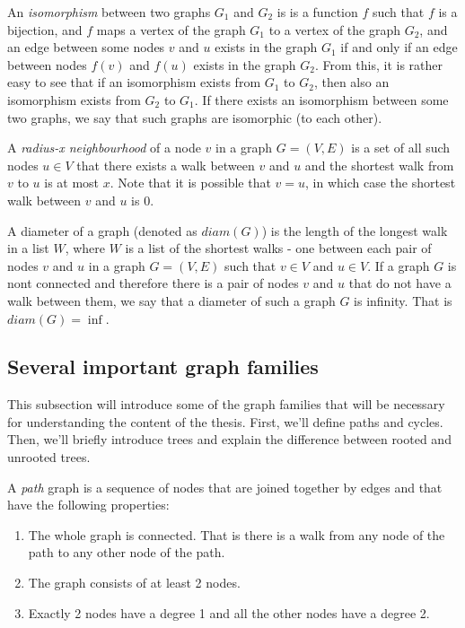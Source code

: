 An \emph{isomorphism} between two graphs $G_1$ and $G_2$ is is a function $f$ such that $f$ is a 
bijection, and $f$ maps a vertex of the graph $G_1$ to a vertex of the graph $G_2$, and 
an edge between some nodes $v$ and $u$ exists in the graph $G_1$ if and only if
an edge between nodes $f(v)$ and $f(u)$ exists in the graph $G_2$. From this,
it is rather easy to see that if an isomorphism exists from $G_1$ to $G_2$, then
also an isomorphism exists from $G_2$ to $G_1$. If there exists an
isomorphism between some two graphs, we say that such graphs are isomorphic
(to each other).

A \emph{radius-x neighbourhood} of a node $v$ in a graph $G = (V, E)$ is a set of
all such nodes $u \in V$ that there exists a walk between $v$ and $u$ and 
the shortest walk from $v$ to $u$ is at most $x$. Note that it is possible that
$v = u$, in which case the shortest walk between $v$ and $u$ is 0.

A diameter of a graph (denoted as $diam(G)$) is the length of the longest walk
in a list $W$, where $W$ is a list of the shortest walks - one between each pair of nodes
$v$ and $u$ in a graph $G = (V, E)$ such that $v \in V$ and $u \in V$. If a graph
$G$ is nont connected and therefore there is a pair of nodes $v$ and $u$ that do not
have a walk between them, we say that a diameter of such a graph $G$ is infinity. That
is $diam(G) = \inf$.

\subsection{Several important graph families}

This subsection will introduce some of the graph families that will be necessary
for understanding the content of the thesis. First, we'll define paths and cycles.
Then, we'll briefly introduce trees and explain the difference between rooted
and unrooted trees.

A \emph{path} graph is a sequence of nodes that are joined together by edges and
that have the following properties:

\begin{enumerate}
  \item The whole graph is connected. That is there is a walk from any node of
  the path to any other node of the path.

  \item The graph consists of at least 2 nodes.

  \item Exactly 2 nodes have a degree 1 and all the other nodes have a degree 2.
\end{enumerate}

